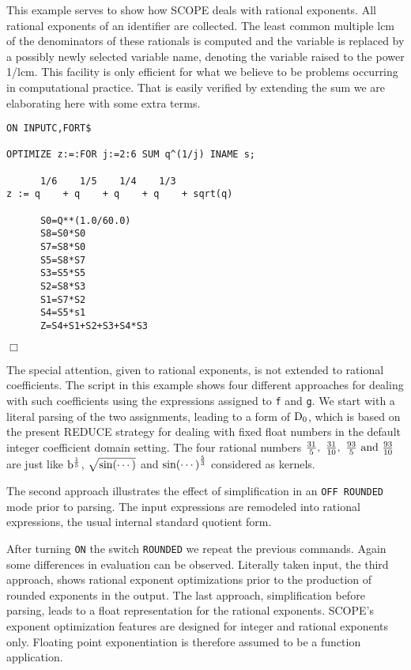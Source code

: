 This example serves to show how SCOPE deals with rational
exponents.  All rational exponents of an identifier are collected.
The least common
multiple lcm of the denominators of these rationals is
computed and the variable is replaced by a possibly newly selected
variable name, denoting the variable raised to the power 1/lcm. This
facility is only efficient for what we believe to be problems
occurring in computational practice. That is easily verified by
extending the sum we are elaborating here with some extra terms.
\newpage
{\small
\begin{verbatim}
ON INPUTC,FORT$

OPTIMIZE z:=:FOR j:=2:6 SUM q^(1/j) INAME s;

      1/6    1/5    1/4    1/3
z := q    + q    + q    + q    + sqrt(q)

      S0=Q**(1.0/60.0)
      S8=S0*S0
      S7=S8*S0
      S5=S8*S7
      S3=S5*S5
      S2=S8*S3
      S1=S7*S2
      S4=S5*s1
      Z=S4+S1+S2+S3+S4*S3
\end{verbatim}
\begin{flushright}
$\Box$
\end{flushright}}
\example\label{ex:3.1.7}

The special attention, given to rational exponents, is not extended to
rational coefficients. The script in this example shows four different
approaches for dealing with such coefficients using the expressions assigned to
{\tt f} and {\tt g}. We start with a literal parsing of the two assignments,
leading to a form of ${\rm D}_0$, which is  based on the present REDUCE
strategy for dealing with fixed float numbers in the default integer
coefficient domain setting.
The four rational numbers $\frac{31}{5} ,~ \frac{31}{10} ,~\frac{93}{5}~
{\rm and}~\frac{93}{10}$ are just like ${\rm b}^{\frac{1}{5}}$, $\sqrt {\rm
sin(\cdots)}$ and ${\rm sin(\cdots)}^{\frac{5}{3}}$ considered as kernels.

The second approach illustrates the effect of simplification in
an {\tt OFF ROUNDED} mode prior to parsing. The input expressions are
remodeled into rational expressions, the usual internal standard quotient form.

After turning {\tt ON} the switch  {\tt ROUNDED}  we repeat the previous
commands. Again some differences in evaluation can be observed. Literally
taken input, the third approach,  shows rational exponent optimizations
prior to the production of rounded exponents in the output.
The last approach, simplification before parsing, leads to a float
representation for the rational exponents. SCOPE's exponent optimization
features are designed for integer and rational exponents only. Floating
point exponentiation is therefore assumed to be a function application.

